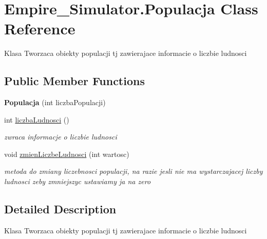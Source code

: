 \hypertarget{class_empire___simulator_1_1_populacja}{\section{Empire\+\_\+\+Simulator.\+Populacja Class Reference}
\label{class_empire___simulator_1_1_populacja}
}


Klasa Tworzaca obiekty populacji tj zawierajace informacie o liczbie ludnosci  


\subsection*{Public Member Functions}
\begin{DoxyCompactItemize}
\item 
\hypertarget{class_empire___simulator_1_1_populacja_a4287735452b732a6c6d16e594a354097}{{\bfseries Populacja} (int liczba\+Populacji)}\label{class_empire___simulator_1_1_populacja_a4287735452b732a6c6d16e594a354097}

\item 
int \hyperlink{class_empire___simulator_1_1_populacja_aee4754bb3c5c73f8eee553cb5af8cf7e}{liczba\+Ludnosci} ()
\begin{DoxyCompactList}\small\item\em zwraca informacje o liczbie ludnosci \end{DoxyCompactList}\item 
void \hyperlink{class_empire___simulator_1_1_populacja_ae34999adbd8cff5ab9471a1b806374b0}{zmien\+Liczbe\+Ludnosci} (int wartosc)
\begin{DoxyCompactList}\small\item\em metoda do zmiany liczebnosci populacji, na razie jesli nie ma wystarczajacej liczby ludnosci zeby zmniejszyc ustawiamy ja na zero \end{DoxyCompactList}\end{DoxyCompactItemize}


\subsection{Detailed Description}
Klasa Tworzaca obiekty populacji tj zawierajace informacie o liczbie ludnosci 



